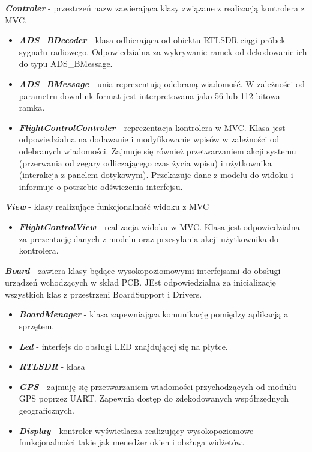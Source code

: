 \documentclass[eng,printmode]{mgr}
\begin{document}
\noindent
\textbf{\textit{Controler}} - przestrzeń nazw zawierająca klasy związane z realizacją kontrolera z MVC.
\begin{itemize}[label={}]
  \item \textbf{\textit{ADS\_BDecoder}} - klasa odbierająca od obiektu RTLSDR ciągi próbek sygnału radiowego. Odpowiedzialna za wykrywanie ramek od dekodowanie ich do typu ADS\_BMessage.
  \item \textbf{\textit{ADS\_BMessage}} - unia reprezentują odebraną wiadomość. W zależności od parametru downlink format jest interpretowana jako 56 lub 112 bitowa ramka.
  \item \textbf{\textit{FlightControlControler}} - reprezentacja kontrolera w MVC. Klasa jest odpowiedzialna na dodawanie i modyfikowanie wpisów w zależności od odebranych wiadomości. Zajmuje się również przetwarzaniem akcji systemu (przerwania od zegary odliczającego czas życia wpisu) i użytkownika (interakcja z panelem dotykowym). Przekazuje dane z modelu do widoku i informuje o potrzebie odświeżenia interfejsu.
\end{itemize}
\vskip 0.55cm

\noindent
\textbf{\textit{View}} - klasy realizujące funkcjonalność widoku z MVC
\begin{itemize}[label={}]
  \item \textbf{\textit{FlightControlView}} - realizacja widoku w MVC. Klasa jest odpowiedzialna za prezentację danych z modelu oraz przesyłania akcji użytkownika do kontrolera.
\end{itemize}
\vskip 0.55cm

\noindent
\textbf{\textit{Board}} - zawiera klasy będące wysokopoziomowymi interfejsami do obsługi urządzeń wchodzących w skład PCB. JEst odpowiedzialna za inicializację wszystkich klas z przestrzeni BoardSupport i Drivers.
\begin{itemize}[label={}]
  \item \textbf{\textit{BoardMenager}} - klasa zapewniająca komunikację pomiędzy aplikacją a sprzętem.
  \item \textbf{\textit{Led}} - interfejs do obsługi LED znajdującej się na płytce.
  \item \textbf{\textit{RTLSDR}} - klasa 
  \item \textbf{\textit{GPS}} - zajmuję się przetwarzaniem wiadomości przychodzących od modułu GPS poprzez UART. Zapewnia dostęp do zdekodowanych współrzędnych geograficznych.
  \item \textbf{\textit{Display}} - kontroler wyświetlacza realizujący wysokopoziomowe funkcjonalności takie jak menedżer okien i obsługa widżetów.
\end{itemize}
\vskip 0.55cm
\end{document}
